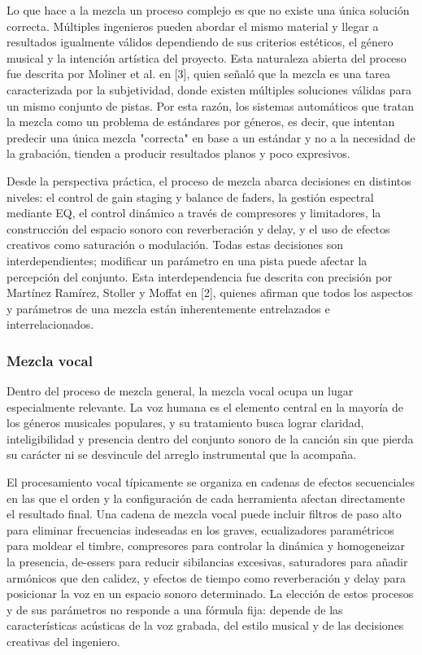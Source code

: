 \documentclass[12pt]{article}
\begin{document}
Lo que hace a la mezcla un proceso complejo es que no existe una única solución correcta. Múltiples ingenieros pueden abordar el mismo material y llegar a resultados igualmente válidos dependiendo de sus criterios estéticos, el género musical y la intención artística del proyecto. Esta naturaleza abierta del proceso fue descrita por Moliner et al. en [3], quien señaló que la mezcla es una tarea caracterizada por la subjetividad, donde existen múltiples soluciones válidas para un mismo conjunto de pistas. Por esta razón, los sistemas automáticos que tratan la mezcla como un problema de estándares por géneros, es decir, que intentan predecir una única mezcla "correcta" en base a un estándar y no a la necesidad de la grabación, tienden a producir resultados planos y poco expresivos.

Desde la perspectiva práctica, el proceso de mezcla abarca decisiones en distintos niveles: el control de gain staging y balance de faders, la gestión espectral mediante EQ, el control dinámico a través de compresores y limitadores, la construcción del espacio sonoro con reverberación y delay, y el uso de efectos creativos como saturación o modulación. Todas estas decisiones son interdependientes; modificar un parámetro en una pista puede afectar la percepción del conjunto. Esta interdependencia fue descrita con precisión por Martínez Ramírez, Stoller y Moffat en [2], quienes afirman que todos los aspectos y parámetros de una mezcla están inherentemente entrelazados e interrelacionados.

\subsubsection*{Mezcla vocal}

Dentro del proceso de mezcla general, la mezcla vocal ocupa un lugar especialmente relevante. La voz humana es el elemento central en la mayoría de los géneros musicales populares, y su tratamiento busca lograr claridad, inteligibilidad y presencia dentro del conjunto sonoro de la canción sin que pierda su carácter ni se desvincule del arreglo instrumental que la acompaña.

El procesamiento vocal típicamente se organiza en cadenas de efectos secuenciales en las que el orden y la configuración de cada herramienta afectan directamente el resultado final. Una cadena de mezcla vocal puede incluir filtros de paso alto para eliminar frecuencias indeseadas en los graves, ecualizadores paramétricos para moldear el timbre, compresores para controlar la dinámica y homogeneizar la presencia, de-essers para reducir sibilancias excesivas, saturadores para añadir armónicos que den calidez, y efectos de tiempo como reverberación y delay para posicionar la voz en un espacio sonoro determinado. La elección de estos procesos y de sus parámetros no responde a una fórmula fija: depende de las características acústicas de la voz grabada, del estilo musical y de las decisiones creativas del ingeniero.
\end{document}
